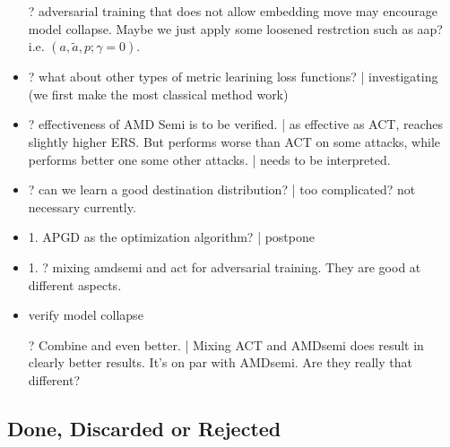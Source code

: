 \begin{itemize}
	\item [?] adversarial training that does not allow embedding move may
		encourage model collapse. Maybe we just apply some loosened restrction
		such as aap? i.e. $(a,\tilde{a},p;\gamma=0)$.

	\item ?  what about other types of metric learining loss functions? |
		investigating (we first make the most classical method work)

	\item ?  effectiveness of AMD Semi is to be verified. | as effective
		as ACT, reaches slightly higher ERS. But performs worse than ACT on
		some attacks, while performs better one some other attacks. | needs to
		be interpreted.

	\item ? can we learn a good destination distribution? | too
		complicated? not necessary currently.

	\item 1. APGD as the optimization algorithm? | postpone

	\item 1. ? mixing amdsemi and act for adversarial training. They are good
		at different aspects.

	\item verify model collapse

	\item [?] Combine and even better. | Mixing ACT and AMDsemi does result
		in clearly better results. It's on par with AMDsemi. Are they really
		that different?

\end{itemize}


\subsection{Done, Discarded or Rejected}


